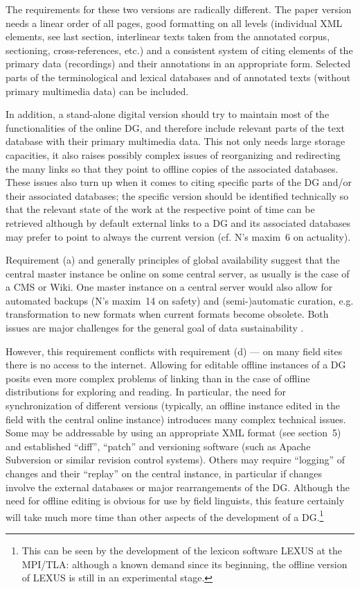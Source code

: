 The requirements for these two versions are radically different. The paper version needs a linear order of all pages, good formatting on all levels (individual XML elements, see last section, interlinear texts taken from the annotated corpus, sectioning, cross-references, etc.) and a consistent system of citing elements of the primary data (recordings) and their annotations in an appropriate form. Selected parts of the terminological and lexical databases and of annotated texts (without primary multimedia data) can be included. 

In addition, a stand-alone digital version should try to maintain most of the functionalities of the online DG, and therefore include relevant parts of the text database with their primary multimedia data. This not only needs large storage capacities, it also raises possibly complex issues of reorganizing and redirecting the many links so that they point to offline copies of the associated databases. These issues also turn up when it comes to citing specific parts of the DG and/or their associated databases; the specific version should be identified technically so that the relevant state of the work at the respective point of time can be retrieved although by default external links to a DG and its associated databases may prefer to point to always the current version (cf. N's maxim~6 on actuality).

Requirement (a) and generally principles of global availability suggest that the central master instance be online on some central server, as usually is the case of a CMS or Wiki. One master instance on a central server would also allow for automated backups (N's maxim~14 on safety) and (semi-)automatic curation, e.g. transformation to new formats when current formats become obsolete. Both issues are major challenges for the general goal of data sustainability \citep[cf.][]{BirdEtAl2003}.

However, this requirement conflicts with requirement (d) --- on many field sites there is no access to the internet. Allowing for editable offline instances of a DG posits even more complex problems of linking than in the case of offline distributions for exploring and reading. In particular, the need for synchronization of different versions (typically, an offline instance edited in the field with the central online instance) introduces many complex technical issues. Some may be addressable by using an appropriate XML format (see section~5) and established ``diff'', ``patch'' and versioning software (such as Apache Subversion or similar revision control systems). Others may require ``logging'' of changes and their ``replay'' on the central instance, in particular if changes involve the external databases or major rearrangements of the DG. Although the need for offline editing is obvious for use by field linguists, this feature certainly will take much more time than other aspects of the development of a DG.\footnote{This 
 can be seen by the development of the lexicon software LEXUS at the MPI/TLA: although a known demand since its beginning, the offline version of LEXUS is still in an experimental stage.}

